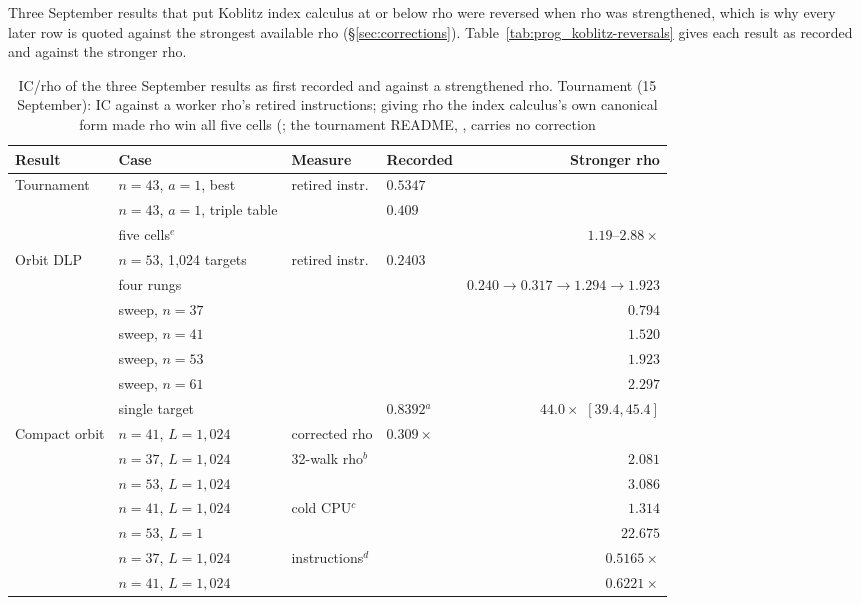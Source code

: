Three September results that put Koblitz index calculus at or below rho
were reversed when rho was strengthened, which is why every later row is
quoted against the strongest available rho
(\S\ref{sec:corrections}). Table~\ref{tab:prog_koblitz-reversals} gives
each result as recorded and against the stronger rho.

\begin{table}[t]
\centering\small
\begin{tabular}{@{}llllr@{}}
\toprule
Result & Case & Measure & Recorded & Stronger rho \\
\midrule
Tournament & $n=43$, $a=1$, best & retired instr. & $0.5347$ & \\
 & $n=43$, $a=1$, triple table & & $0.409$ & \\
 & five cells$^{e}$ & & & $1.19$--$2.88\times$ \\
\addlinespace
Orbit DLP & $n=53$, 1{,}024 targets & retired instr. & $0.2403$ & \\
 & four rungs & & & $0.240\to0.317\to1.294\to1.923$ \\
 & sweep, $n=37$ & & & $0.794$ \\
 & sweep, $n=41$ & & & $1.520$ \\
 & sweep, $n=53$ & & & $1.923$ \\
 & sweep, $n=61$ & & & $2.297$ \\
 & single target & & $0.8392$$^{a}$ & $44.0\times$ $[39.4,45.4]$ \\
\addlinespace
Compact orbit & $n=41$, $L=1{,}024$ & corrected rho & $0.309\times$ & \\
 & $n=37$, $L=1{,}024$ & 32-walk rho$^{b}$ & & $2.081$ \\
 & $n=53$, $L=1{,}024$ & & & $3.086$ \\
 & $n=41$, $L=1{,}024$ & cold CPU$^{c}$ & & $1.314$ \\
 & $n=53$, $L=1$ & & & $22.675$ \\
 & $n=37$, $L=1{,}024$ & instructions$^{d}$ & & $0.5165\times$ \\
 & $n=41$, $L=1{,}024$ & & & $0.6221\times$ \\
\bottomrule
\end{tabular}
\caption[]{IC/rho of the three September results as first recorded and
against a strengthened rho. Tournament (15 September): IC against a worker
rho's retired instructions; giving rho the index calculus's own canonical
form made rho win all five cells
(; the tournament README,
, carries no correction
}
\end{table}
